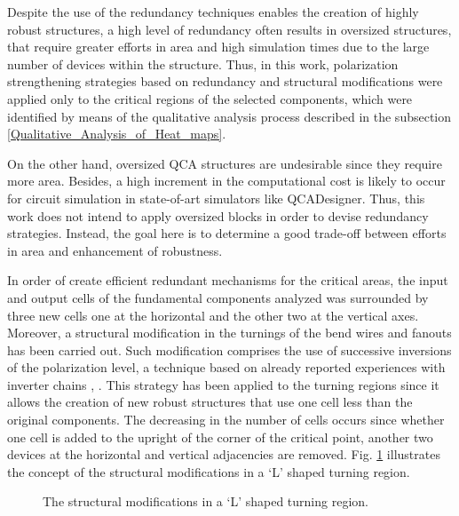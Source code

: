 Despite the use of the redundancy techniques enables the creation of highly robust structures, a high level of redundancy often results in oversized structures, that require greater efforts in area and high simulation times due to the large number of devices within the structure. Thus, in this work, polarization strengthening strategies based on redundancy and structural modifications were applied only to the critical regions of the selected components, which were identified by means of the qualitative analysis process described in the subsection \ref{Qualitative_Analysis_of_Heat_maps}.

On the other hand, oversized QCA structures are undesirable since they require more area. Besides, a high increment in the computational cost is likely to occur for circuit simulation in state-of-art simulators like QCADesigner. Thus, this work does not intend to apply oversized blocks in order to devise redundancy strategies. Instead, the goal here is to determine a good trade-off between efforts in area and enhancement of robustness.

In order of create efficient redundant mechanisms for the critical areas, the input and output cells of the fundamental components analyzed was surrounded by three new cells \textemdash one at the horizontal and the other two at the vertical axes. Moreover, a structural modification in the turnings of the bend wires and fanouts has been carried out. Such modification comprises the use of successive inversions of the polarization level, a technique based on already reported experiences with inverter chains \cite{gupta07}, \cite{padgett10}. This strategy has been applied to the turning regions since it allows the creation of new robust structures that use one cell less than the original components. The decreasing in the number of cells occurs since whether one cell is added to the upright of the corner of the critical point, another two devices at the horizontal and vertical adjacencies are removed. Fig. \ref{figure:turnings} illustrates the concept of the structural modifications in a `L' shaped turning region.

\begin{figure}[!ht]
\center
{}
\hfill
{}

\caption{The structural modifications in a `L' shaped turning region.}
\label{figure:turnings}
\end{figure}

